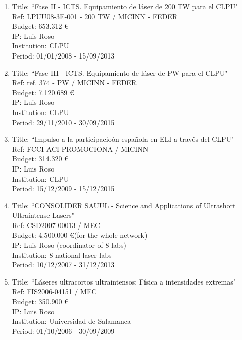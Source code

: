 \begin{enumerate}
\item Title: ``Fase II - ICTS. Equipamiento de l\'aser de 200 TW para el CLPU"\\
Ref:   LPUU08-3E-001 - 200 TW     / MICINN - FEDER \\
Budget:  653.312 \euro \\
IP:  Luis Roso \\
Institution:  CLPU \\
Period: 01/01/2008 - 15/09/2013 \\

\item Title: ``Fase III - ICTS. Equipamiento de l\'aser de PW para el CLPU"\\
Ref:  ref. 374 - PW     / MICINN - FEDER \\
Budget: 7.120.689 \euro \\
IP:  Luis Roso   \\
Institution:  CLPU \\
Period: 29/11/2010 - 30/09/2015 \\

\item Title: ``Impulso a la participacio\'on espa\~nola en ELI a trav\'es del CLPU"\\
Ref:   FCCI ACI PROMOCIONA     / MICINN \\
Budget:  314.320 \euro \\
IP:  Luis Roso \\
Institution:   CLPU   \\
Period: 15/12/2009 - 15/12/2015 \\

\item Title: ``CONSOLIDER SAUUL - Science and Applications of Ultrashort Ultraintense Lasers"\\
Ref:  CSD2007-00013     / MEC \\
Budget:  4.500.000 \euro (for the whole network) \\
IP:  Luis Roso (coordinator of 8 labs) \\
Institution:  8 national laser labs \\
Period:  10/12/2007 - 31/12/2013 \\

\item Title: ``L\'aseres ultracortos ultraintensos: F\'isica a intensidades extremas"\\
Ref:  FIS2006-04151     / MEC \\
Budget:  350.900  \euro \\
IP:  Luis Roso \\
Institution: Universidad de Salamanca \\
Period: 01/10/2006 - 30/09/2009 \\


\end{enumerate}
